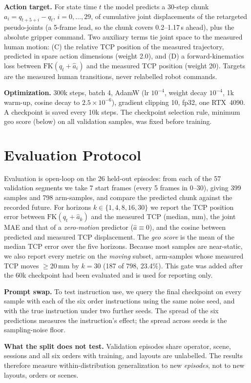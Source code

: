 \documentclass[conference,10pt]{IEEEtran}
\newcommand{\mm}{\,mm\xspace}
\begin{document}
\textbf{Action target.} For state time $t$ the model predicts a 30-step chunk $a_i = q_{t+5+i}-q_t$, $i=0,\dots,29$, of
cumulative joint displacements of the retargeted pseudo-joints (a 5-frame lead, so the chunk covers 0.2--1.17\,s ahead), plus
the absolute gripper command. Two auxiliary terms tie joint space to the measured human motion: (C) the relative TCP position
of the measured trajectory, predicted in spare action dimensions (weight 2.0), and (D) a forward-kinematics loss between
$\mathrm{FK}(q_t+\hat a_i)$ and the measured TCP position (weight 20). Targets are the measured human transitions, never
relabelled robot commands.

\textbf{Optimization.} 300k steps, batch 4, AdamW (lr $10^{-4}$, weight decay $10^{-4}$, 1k warm-up, cosine decay to
$2.5\times10^{-6}$), gradient clipping 10, fp32, one RTX~4090. A checkpoint is saved every 10k steps.
The checkpoint selection rule, minimum geo score (below) on all validation samples, was fixed before training.

\section{Evaluation Protocol}\label{p1:sec:eval}
Evaluation is open-loop on the 26 held-out episodes: from each of the 57 validation segments we take 7 start frames (every 5
frames in 0--30), giving 399 samples and 798 arm-samples, and compare the predicted chunk against the recorded future.
For horizons $k\in\{1,4,8,16,30\}$ we report the TCP position error between $\mathrm{FK}(q_t+\hat a_k)$ and the measured TCP
(median, mm), the joint MAE and that of a \emph{zero-motion} predictor ($\hat a\equiv0$), and the cosine between predicted and
measured TCP displacement. The \emph{geo score} is the mean of the median TCP error over the five horizons. Because most samples
are near-static, we also report every metric on the \emph{moving} subset, arm-samples whose measured TCP moves $\ge$20\mm by $k{=}30$
(187 of 798, 23.4\%). This gate was added after the 60k checkpoint had been evaluated and is used for reporting only.

\textbf{Prompt swap.} To test instruction use, we query the final checkpoint on every sample with each of the six order
instructions using the same noise seed, and with the true instruction under two further seeds. The spread of the six
predictions measures the instruction's effect; the spread across seeds is the sampling-noise floor.

\textbf{What the split does not test.} Validation episodes share operator, scene, sessions and all six orders with training,
and layouts are unlabelled. The results therefore measure within-distribution generalization to new \emph{episodes}, not to new
layouts, orders or scenes.
\end{document}
